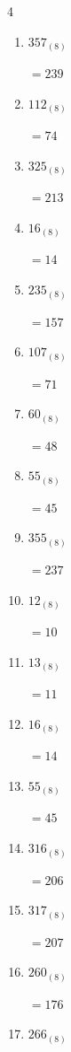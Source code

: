 \begin{multicols}{4}
\begin{enumerate}
  \item $357_{(8)}$

        $=239$

  \item $112_{(8)}$

        $=74$

  \item $325_{(8)}$

        $=213$

  \item $16_{(8)}$

        $=14$

  \item $235_{(8)}$

        $=157$

  \item $107_{(8)}$

        $=71$

\columnbreak %

  \item $60_{(8)}$

        $=48$

  \item $55_{(8)}$

        $=45$

  \item $355_{(8)}$

        $=237$

  \item $12_{(8)}$

        $=10$

  \item $13_{(8)}$

        $=11$

  \item $16_{(8)}$

        $=14$

  \item $55_{(8)}$

        $=45$

  \item $316_{(8)}$

        $=206$

  \item $317_{(8)}$

        $=207$

  \item $260_{(8)}$

        $=176$

  \item $266_{(8)}$


\end{enumerate}
\end{multicols}
